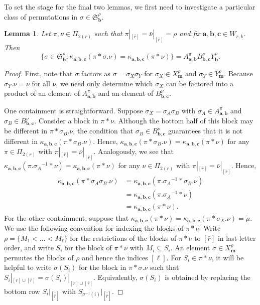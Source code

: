 \documentclass[10pt]{amsart}
\theoremstyle{definition}
\theoremstyle{definition}
\theoremstyle{plain}
\newtheorem{lemma}[lemma]{Lemma}
\theoremstyle{remark}
\theoremstyle{plain}
\theoremstyle{plain}
\newcommand{\SG}{\mathfrak{S}}
\newcommand{\bfa}{{\boldsymbol{a}}}
\newcommand{\bfb}{{\boldsymbol{b}}}
\newcommand{\bfc}{{\boldsymbol{c}}}
\newcommand{\bfm}{{\boldsymbol{m}}}
\newcommand{\tmu}{{\tilde{\mu}}}
\newcommand{\ov}[1]{\bar{#1}}
\newcommand{\ovb}[1]{\left[\ov{#1}\right]}
\newcommand{\ovov}[1]{\bar{\bar{#1}}}
\newcommand{\ovovb}[1]{\left[\ovov{#1}\right]}
\begin{document}
To set the stage for the final two lemmas, we first need to investigate a particular class of permutations in $\sigma\in\SG_\bfb^\rho$.

\begin{lemma}\label{moveMiddleWithoutChangingMSP} Let $\pi, \nu\in\Pi_{2(r)}$ such that $\pi|_{\ovb{r}}=\ov\nu|_{\ovb{r}}=\rho$ and fix $\bfa,\bfb,\bfc\in W_{r,k}$. Then \[\{\sigma\in \SG_\bfb^\rho:\kappa_{\bfa,\bfb,\bfc}(\pi\ast \sigma.\nu)=\kappa_{\bfa,\bfb,\bfc}(\pi\ast\nu)\}=A_{\bfa,\bfb}^\pi B_{\bfb,\bfc}^{\nu}Y_{\bfb}^\rho.\]
\end{lemma}

\begin{proof}
First, note that $\sigma$ factors as $\sigma=\sigma_X\sigma_Y$ for $\sigma_X\in X_\bfm^\rho$ and $\sigma_Y\in Y_\bfm^\rho$. Because $\sigma_Y.\nu=\nu$ for all $\nu$, we need only determine which $\sigma_X$ can be factored into a product of an element of $A_{\bfa,\bfb}^\pi$ and an element of $B_{\bfb,\bfc}^\nu$.

One containment is straightforward. Suppose $\sigma_X=\sigma_A\sigma_B$ with $\sigma_A\in A_{\bfa,\bfb}^{\pi}$ and $\sigma_B\in B_{\bfb,\bfc}^{\nu}$. Consider a block in $\pi\ast\nu$. Although the bottom half of this block may be different in $\pi\ast \sigma_B.\nu$, the condition that $\sigma_B\in B_{\bfb,\bfc}^{\nu}$ guarantees that it is not different in $\kappa_{\bfa,\bfb,\bfc}(\pi\ast \sigma_B.\nu)$. Hence, $\kappa_{\bfa,\bfb,\bfc}(\pi\ast \sigma_B.\nu)=\kappa_{\bfa,\bfb,\bfc}(\pi\ast\nu)$ for any $\pi\in\Pi_{2(r)}$ with $\pi|_{\ovb{r}}=\ov\nu|_{\ovb{r}}$. Analogously, we see that $\kappa_{\bfa,\bfb,\bfc}(\pi.{\sigma_A}^{-1}\ast \nu)=\kappa_{\bfa,\bfb,\bfc}(\pi\ast\nu)$ for any $\nu\in\Pi_{2(r)}$ with $\pi|_{\ovb{r}}=\ov\nu|_{\ovb{r}}$. Hence,
\begin{align*}
    \kappa_{\bfa,\bfb,\bfc}(\pi\ast \sigma_A\sigma_B.\nu)&=\kappa_{\bfa,\bfb,\bfc}(\pi.{\sigma_A}^{-1}\ast \sigma_B.\nu)\\
    &=\kappa_{\bfa,\bfb,\bfc}(\pi.{\sigma_A}^{-1}\ast \nu)\\
    &=\kappa_{\bfa,\bfb,\bfc}(\pi\ast\nu).
\end{align*}
For the other containment, suppose that $\kappa_{\bfa,\bfb,\bfc}(\pi\ast\nu)=\kappa_{\bfa,\bfb,\bfc}(\pi\ast \sigma_X.\nu)=\tmu$. We use the following convention for indexing the blocks of $\pi\ast\nu$. Write $\rho=\{M_1<\dots< M_\ell\}$ for the restrictions of the blocks of $\pi\ast\nu$ to $\ovb{r}$ in last-letter order, and write $S_i$ for the block of $\pi\ast\nu$ with $M_i\subseteq S_i$. An element $\sigma\in X_\bfm^\rho$ permutes the blocks of $\rho$ and hence the indices $[\ell]$. For $S_i\in\pi\ast\nu$, it will be helpful to write $\sigma(S_i)$ for the block in $\pi\ast \sigma.\nu$ such that $S_i|_{[r]\cup\ovb{r}}=\sigma(S_i)|_{[r]\cup\ovb{r}}$. Equivalently, $\sigma(S_i)$ is obtained by replacing the bottom row $S_i|_{\ovovb{r}}$ with $S_{\sigma^{-1}(i)}|_{\ovovb{r}}$.


\end{proof}
\end{document}
